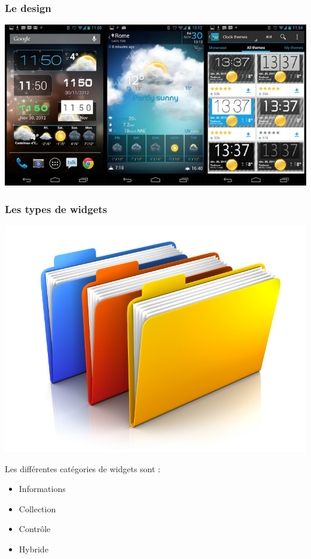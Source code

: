 \documentclass{beamer}
\begin{document}
\begin{frame}
\frametitle{Le design}
\begin{center}
\includegraphics[scale=0.4]{widgets.jpg}
\end{center}
\end{frame}

\begin{frame}
\frametitle{Les types de widgets}
\begin{center}
\includegraphics[scale=0.5]{folders.jpg}
\end{center}
\begin{block}{Les différentes catégories de widgets sont :}
\begin{itemize}
\item Informations
\item Collection
\item Contrôle
\item Hybride
\end{itemize}
\end{block}
\end{frame}
\end{document}
